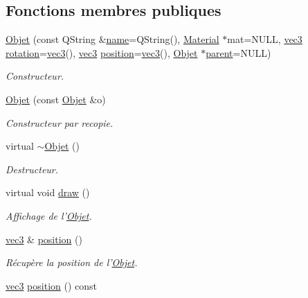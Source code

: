 \subsection*{Fonctions membres publiques}
\begin{DoxyCompactItemize}
\item 
\hyperlink{class_objet_aea29e90dc963beb399d3028b7322039f}{Objet} (const Q\+String \&\hyperlink{class_objet_a4a702c189bedcbf1e65da6aec72c8e44}{name}=Q\+String(), \hyperlink{class_material}{Material} $\ast$mat=N\+U\+L\+L, \hyperlink{structvec3}{vec3} \hyperlink{class_objet_ac69a1b459bcb4433099c8cfbff06b209}{rotation}=\hyperlink{structvec3}{vec3}(), \hyperlink{structvec3}{vec3} \hyperlink{class_objet_a0e109bc790b14328202dd2546b04e2fd}{position}=\hyperlink{structvec3}{vec3}(), \hyperlink{class_objet}{Objet} $\ast$\hyperlink{class_objet_a95e63a98dc9dc485fe874df30f2069ee}{parent}=N\+U\+L\+L)
\begin{DoxyCompactList}\small\item\em Constructeur. \end{DoxyCompactList}\item 
\hyperlink{class_objet_aeaf99767deb7996bd323185ba22e8ca1}{Objet} (const \hyperlink{class_objet}{Objet} \&o)
\begin{DoxyCompactList}\small\item\em Constructeur par recopie. \end{DoxyCompactList}\item 
virtual \hyperlink{class_objet_a77a195bb1452ef4221b5080632cd7757}{$\sim$\+Objet} ()
\begin{DoxyCompactList}\small\item\em Destructeur. \end{DoxyCompactList}\item 
virtual void \hyperlink{class_objet_a5cc323f562964e00b947b2d908e206e7}{draw} ()
\begin{DoxyCompactList}\small\item\em Affichage de l'\hyperlink{class_objet}{Objet}. \end{DoxyCompactList}\item 
\hyperlink{structvec3}{vec3} \& \hyperlink{class_objet_a0e109bc790b14328202dd2546b04e2fd}{position} ()
\begin{DoxyCompactList}\small\item\em Récupère la position de l'\hyperlink{class_objet}{Objet}. \end{DoxyCompactList}\item 
\hyperlink{structvec3}{vec3} \hyperlink{class_objet_a79051e09eb1aa72dcd338ed033e9f3f1}{position} () const 

\end{DoxyCompactItemize}
